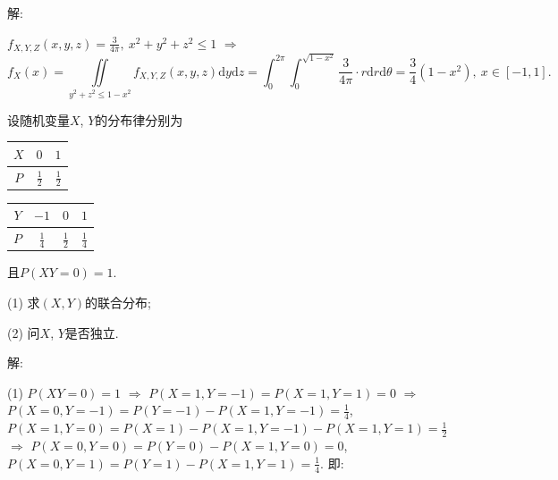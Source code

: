 \documentclass[standard]{ExBook}
\begin{document}
\begin{qitems}
\vspace{-5em}

    \begin{bbox}
解: 

$f_{X,Y,Z}(x,y,z)=\frac{3}{4\pi},\ x^2+y^2+z^2\leq1$ $\Longrightarrow$
$$f_{X}(x)=\iint\limits_{y^2+z^2\leq 1-x^2}f_{X,Y,Z}(x,y,z)\mathrm{d}y\mathrm{d}z=\int_{0}^{2\pi}\int_{0}^{\sqrt{1-x^2}}\frac{3}{4\pi}\cdot r\mathrm{d}r\mathrm{d}\theta=\frac{3}{4}(1-x^2),\ x\in[-1,1].$$
    \end{bbox}

\vspace{-5em}

    \begin{bbox}
    \begin{shaded}
        \qitem
设随机变量$X$, $Y$的分布律分别为

\vspace{0.5em}
\renewcommand{\arraystretch}{1.2}
\setlength{\tabcolsep}{2em}
\begin{minipage}[c]{0.4\textwidth}
\centering
\begin{tabular}{c|cc}
    $X$ & $0$ & $1$\\
    \hline
    $P$ & $\displaystyle\frac{1}{2}$ & $\displaystyle\frac{1}{2}$
\end{tabular}
\end{minipage}
\begin{minipage}[c]{0.6\textwidth}
\centering
\begin{tabular}{c|ccc}
    $Y$ & $-1$ & $0$ & $1$\\
    \hline
    $P$ & $\displaystyle\frac{1}{4}$ & $\displaystyle\frac{1}{2}$ & $\displaystyle\frac{1}{4}$
\end{tabular}
\end{minipage}
\vspace{0.2em}

且$P(XY=0)=1$.

(1) 求$(X,Y)$的联合分布;

(2) 问$X$, $Y$是否独立.
    \end{shaded}
    \end{bbox}

\vspace{-5em}

    \begin{bbox}
解: 

(1) $P(XY=0)=1$ $\Longrightarrow$ $P(X=1,Y=-1)=P(X=1,Y=1)=0$ $\Longrightarrow$ $P(X=0,Y=-1)=P(Y=-1)-P(X=1,Y=-1)=\frac{1}{4}$, $P(X=1,Y=0)=P(X=1)-P(X=1,Y=-1)-P(X=1,Y=1)=\frac{1}{2}$ $\Longrightarrow$ $P(X=0,Y=0)=P(Y=0)-P(X=1,Y=0)=0$, $P(X=0,Y=1)=P(Y=1)-P(X=1,Y=1)=\frac{1}{4}$. 即:
    \end{bbox}


\end{qitems}
\end{document}
